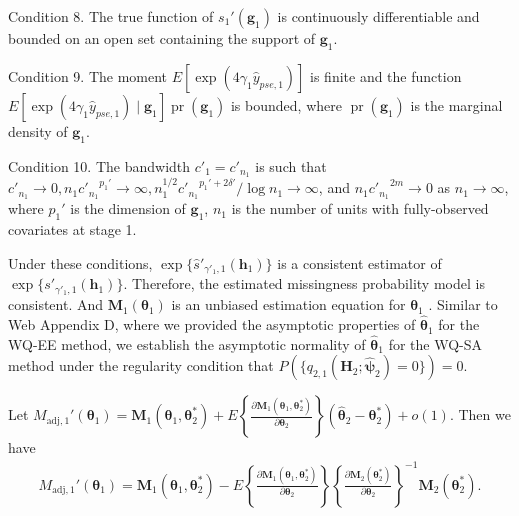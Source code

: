 \documentclass[12pt]{article}
\DeclareMathOperator{\pr}{pr}
\begin{document}
Condition 8. The true function of $s_1'(\bm{g}_1)$ is continuously differentiable and bounded on an open set containing the support of $\bm{g}_1$.

Condition 9. The moment $E[\exp (4 \gamma_1 \widehat{y}_{pse,1})]$ is finite and the function $E[\exp (4 \gamma_1 \widehat{y}_{pse,1}) \mid \bm{g}_1] \pr(\bm{g}_1)$ is bounded, where $\pr(\bm{g}_1)$ is the marginal density of $\bm{g}_1$.

Condition 10. The bandwidth $c'_1=c'_{n_1}$ is such that $c'_{n_1} \rightarrow 0, n_1 {c'_{n_1}}^{p_1'} \rightarrow \infty, n_1^{1/2} {c'_{n_1}}^{p_1'+2 \delta'} / \log n_1 \rightarrow \infty$, and $n_1 {c'_{n_1}}^{2 m} \rightarrow 0$ as $n_1 \rightarrow \infty$, where $p_1'$ is the dimension of $\bm{g}_1$, $n_1$ is the number of units with fully-observed covariates at stage 1.

Under these conditions, $\exp\{\widehat{s}'_{\gamma'_1,1}(\bm{h}_1)\}$ is a consistent estimator of $\exp\{s'_{\gamma'_1,1}(\bm{h}_1)\}$. Therefore, the estimated missingness probability model is consistent. And $\bm{M}_1(\bm{\theta}_1)$ is an unbiased estimation equation for $\bm{\theta}_1$ \citep{Newey_McFadden_1994}. Similar to Web Appendix D, where we provided the asymptotic properties of $\widehat{\bm{\theta}}_1$ for the  WQ-EE method, we establish the asymptotic normality of $\widehat{\bm{\theta}}_1$ for the WQ-SA method under the regularity condition that $P(\{q_{2,1}(\bm{H}_2; \widehat{\bm{\psi}}_2) = 0\})=0$. 

Let  $
M_{\mathrm{adj}, 1}'(\bm{\theta}_1) = \bm{M}_1(\bm{\theta}_1, \bm{\theta}_2^*) + E\left\{ \frac{\partial \bm{M}_1(\bm{\theta}_1, \bm{\theta}_2^*)}{\partial \bm{\theta}_2} \right\}
(\widehat{\bm{\theta}}_2 -\bm{\theta}_2^*) + o(1)
$. Then we have
\begin{align*}
    M_{\mathrm{adj}, 1}'(\bm{\theta}_1) = \bm{M}_1(\bm{\theta}_1, \bm{\theta}_2^*) - E\left\{ \frac{\partial \bm{M}_1(\bm{\theta}_1, \bm{\theta}_2^*)}{\partial \bm{\theta}_2} \right\}\left\{ \frac{\partial \bm{M}_2(\bm{\theta}_2^*)}{\partial \bm{\theta}_2} \right\}^{-1}\bm{M}_2(\bm{\theta}_2^*).
\end{align*}
\end{document}
